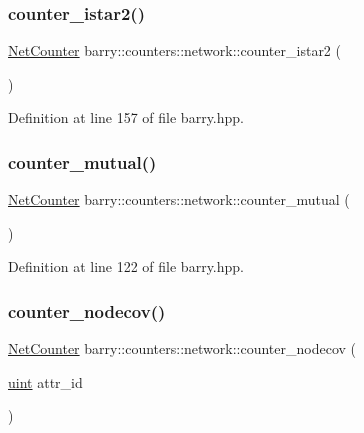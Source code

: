 \subsubsection{\texorpdfstring{counter\+\_\+istar2()}{counter\_istar2()}}
{\footnotesize\ttfamily \hyperlink{namespacebarry_1_1counters_1_1network_a067bd9de04608fc2e1586324d3864a45}{Net\+Counter} barry\+::counters\+::network\+::counter\+\_\+istar2 (\begin{DoxyParamCaption}{ }\end{DoxyParamCaption})\hspace{0.3cm}{\ttfamily [inline]}}



Definition at line 157 of file barry.\+hpp.

\mbox{\label{namespacebarry_1_1counters_1_1network_a9fe5b8896fdcbfaa36df41c105eca4c2}} 
\subsubsection{\texorpdfstring{counter\+\_\+mutual()}{counter\_mutual()}}
{\footnotesize\ttfamily \hyperlink{namespacebarry_1_1counters_1_1network_a067bd9de04608fc2e1586324d3864a45}{Net\+Counter} barry\+::counters\+::network\+::counter\+\_\+mutual (\begin{DoxyParamCaption}{ }\end{DoxyParamCaption})\hspace{0.3cm}{\ttfamily [inline]}}



Definition at line 122 of file barry.\+hpp.

\mbox{\label{namespacebarry_1_1counters_1_1network_a68a87af025966df3b0aa3f22217f43bd}} 
\subsubsection{\texorpdfstring{counter\+\_\+nodecov()}{counter\_nodecov()}}
{\footnotesize\ttfamily \hyperlink{namespacebarry_1_1counters_1_1network_a067bd9de04608fc2e1586324d3864a45}{Net\+Counter} barry\+::counters\+::network\+::counter\+\_\+nodecov (\begin{DoxyParamCaption}\item[{\hyperlink{namespacebarry_a11dfc53ddb4672278319aa04f1e09a6c}{uint}}]{attr\+\_\+id }\end{DoxyParamCaption})\hspace{0.3cm}{\ttfamily [inline]}}



